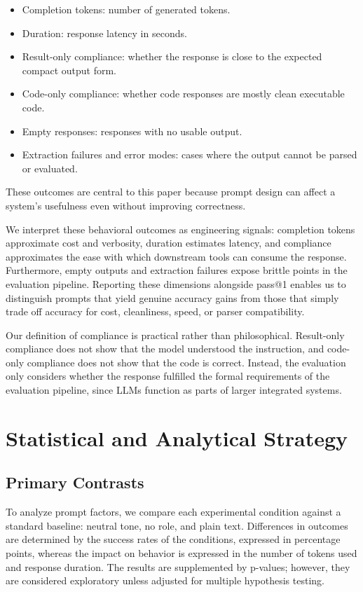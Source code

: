 \documentclass{llncs}
\providecommand{\tightlist}{%
  \setlength{\itemsep}{0pt}\setlength{\parskip}{0pt}}
\begin{document}
\begin{itemize}
\tightlist
\item
  Completion tokens: number of generated tokens.
\item
  Duration: response latency in seconds.
\item
  Result-only compliance: whether the response is close to the expected
  compact output form.
\item
  Code-only compliance: whether code responses are mostly clean
  executable code.
\item
  Empty responses: responses with no usable output.
\item
  Extraction failures and error modes: cases where the output cannot be
  parsed or evaluated.
\end{itemize}

These outcomes are central to this paper because prompt design can affect a system's usefulness even without improving correctness.

We interpret these behavioral outcomes as engineering signals: completion tokens approximate cost and verbosity, duration estimates latency, and compliance approximates the ease with which
downstream tools can consume the response. Furthermore, empty outputs and extraction failures expose brittle points in the evaluation pipeline. Reporting these dimensions alongside pass@1 enables us to distinguish prompts that yield genuine accuracy gains from those that simply trade off accuracy for cost, cleanliness, speed, or parser compatibility.

Our definition of compliance is practical rather than philosophical. Result-only compliance does not show that the model understood the instruction, and code-only compliance does not show that the code is correct. Instead, the evaluation only considers whether the response fulfilled the formal requirements of the evaluation pipeline, since LLMs function as parts of larger integrated systems.

\section{Statistical and Analytical Strategy}\label{statistical-and-analytical-strategy}

\subsection{Primary Contrasts}\label{primary-contrasts}

To analyze prompt factors, we compare each experimental condition against a standard baseline: neutral tone, no role, and plain text. Differences in outcomes are determined by the success rates of the conditions, expressed in percentage points, whereas the impact on behavior is expressed in the number of tokens used and response duration. The results are supplemented by p-values; however, they are considered exploratory unless adjusted for multiple hypothesis testing.
\end{document}
